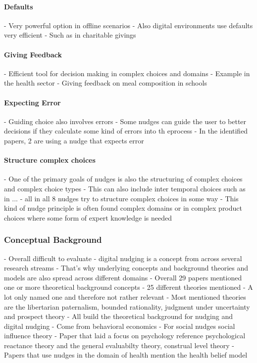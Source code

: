 \paragraph{Defaults}
- Very powerful option in offline scenarios \cite{johnson_defaults_2003}
- Also digital environments use defaults very efficient
- Such as in charitable givings
\paragraph{Giving Feedback}
- Efficient tool for decision making in complex choices and domains
- Example in the health sector
- Giving feedback on meal composition in schools
\paragraph{Expecting Error}
- Guiding choice also involves errors
- Some nudges can guide the user to better decisions if they calculate some kind of errors into th eprocess
- In the identified papers, 2 are using a nudge that expects error
\paragraph{Structure complex choices}
- One of the primary goals of nudges is also the structuring of complex choices and complex choice types
- This can also include inter temporal choices such as in ...
- all in all 8 nudges try to structure complex choices in some way
- This kind of nudge principle is often found complex domains or in complex product choices where some form of expert knowledge is needed

\subsubsection{Conceptual Background} %
- Overall difficult to evaluate
- digital nudging is a concept from across several research streams
- That's why underlying concepts and background theories and models are also spread across different domains
- Overall 29 papers mentioned one or more theoretical background concepts
- 25 different theories mentioned
- A lot only named one and therefore not rather relevant
- Most mentioned theories are the libertarian paternalism, bounded rationality, judgment under uncertainty and prospect theory
- All build the theoretical background for nudging and digital nudging
- Come from behavioral economics
- For social nudges social influence theory
- Paper that laid a focus on psychology reference psychological reactance theory and the general evaluabilty theory, construal level theory
- Papers that use nudges in the domain of health mention the health belief model


